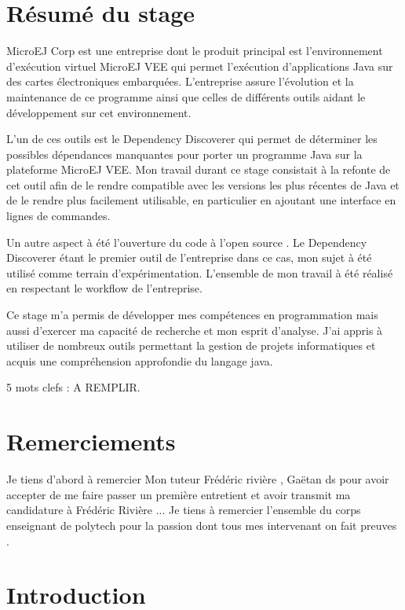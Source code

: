 \documentclass[french,a4paper,12pt]{report}
\begin{document}
\chapter*{Résumé du stage}

MicroEJ Corp est une entreprise dont le produit principal est l'environnement d’exécution virtuel MicroEJ VEE qui permet l’exécution d'applications Java sur des cartes électroniques embarquées. L'entreprise assure l'évolution et la maintenance de ce programme ainsi que celles de différents outils aidant le développement sur cet environnement.

L'un de ces outils est le Dependency Discoverer qui permet de déterminer les possibles dépendances manquantes pour porter un programme Java sur la plateforme MicroEJ VEE. Mon travail durant ce stage consistait à la refonte de cet outil afin de le rendre compatible avec les versions les plus récentes de Java et de le rendre plus facilement utilisable, en particulier en ajoutant une interface en lignes de commandes. 

Un autre aspect à été l'ouverture du code à l'open source . Le Dependency Discoverer étant le premier outil de l'entreprise dans ce cas, mon sujet à été utilisé comme terrain d'expérimentation. L'ensemble de mon travail à été réalisé en respectant le workflow de l'entreprise.

Ce stage m'a permis de développer mes compétences en programmation mais aussi d'exercer ma capacité de recherche et mon esprit d'analyse. J'ai appris à utiliser de nombreux outils permettant la gestion de projets informatiques et acquis une compréhension approfondie du langage java.  

\vspace*{\fill}

5 mots clefs : A REMPLIR.

\chapter*{Remerciements}

Je tiens d’abord à remercier Mon tuteur Frédéric rivière , Gaëtan ds pour avoir accepter de me faire passer un première entretient et avoir transmit ma candidature à Frédéric Rivière ...
Je tiens à remercier l’ensemble du corps enseignant de polytech pour la passion dont tous mes intervenant on fait preuves .

\chapter{Introduction}
\end{document}
